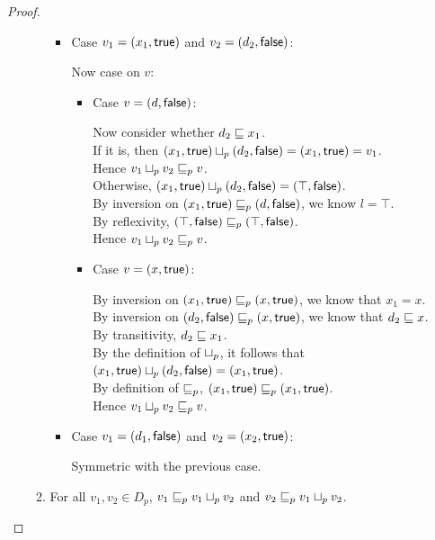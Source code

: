 \begin{proof}
\begin{enumerate}
\begin{enumerate}
\begin{itemize}
   \item Case $v_1 = (x_1, \textsf{true})$ and $v_2 = (d_2, \textsf{false})$: 
  
     Now case on $v$:
     \begin{itemize}
     \item Case $v = (d, \textsf{false})$: 
     
       Now consider whether $d_2 \sqsubseteq x_1$. \\
       If it is, then $(x_1, \textsf{true})  \sqcup_p  (d_2, \textsf{false}) = (x_1, \textsf{true}) = v_1$. \\ 
       Hence $v_1 \sqcup_p v_2 \sqsubseteq_p v$. \\ 
       Otherwise, $(x_1, \textsf{true})  \sqcup_p  (d_2, \textsf{false}) = (\top, \textsf{false})$. \\ 
       By inversion on $(x_1, \textsf{true}) \sqsubseteq_p (d, \textsf{false})$, we know $l = \top$. \\
       By reflexivity, $(\top, \textsf{false}) \sqsubseteq_p (\top, \textsf{false})$. \\ 
       Hence $v_1 \sqcup_p v_2 \sqsubseteq_p v$. 
       
     \item Case $v = (x, \textsf{true})$:  
  
       By inversion on $(x_1, \textsf{true}) \sqsubseteq_p (x, \textsf{true})$, we know that $x_1 = x$. \\ 
       By inversion on $(d_2, \textsf{false}) \sqsubseteq_p (x, \textsf{true})$, we know that $d_2 \sqsubseteq x$. \\ 
       By transitivity, $d_2 \sqsubseteq x_1$. \\ 
       By the definition of $ \sqcup_p $, it follows that $(x_1, \textsf{true})  \sqcup_p  (d_2, \textsf{false}) = (x_1, \textsf{true})$. \\ 
       By definition of $\sqsubseteq_p$, $(x_1, \textsf{true}) \sqsubseteq_p (x_1, \textsf{true})$. \\ 
       Hence $v_1 \sqcup_p v_2 \sqsubseteq_p v$. 
     \end{itemize}
  
   \item Case $v_1 = (d_1, \textsf{false})$ and $v_2 = (x_2, \textsf{true})$: 
  
     Symmetric with the previous case. 
   \end{itemize}
 \item For all $v_1, v_2 \in D_p$, $v_1 \sqsubseteq_p v_1 \sqcup_p v_2$ and $v_2 \sqsubseteq_p v_1 \sqcup_p v_2$.
    

\end{enumerate}
\end{enumerate}
\end{proof}
